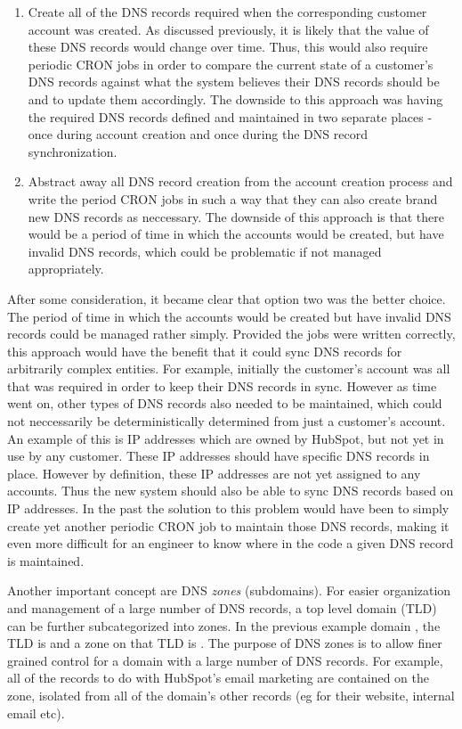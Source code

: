 \begin{enumerate}
    \item{Create all of the DNS records required when the corresponding customer account was created. As discussed previously, it is likely that the value of these DNS records would change over time. Thus, this would also require periodic CRON jobs in order to compare the current state of a customer's DNS records against what the system believes their DNS records should be and to update them accordingly. The downside to this approach was having the required DNS records defined and maintained in two separate places - once during account creation and once during the DNS record synchronization.}
    \item{Abstract away all DNS record creation from the account creation process and write the period CRON jobs in such a way that they can also create brand new DNS records as neccessary. The downside of this approach is that there would be a period of time in which the accounts would be created, but have invalid DNS records, which could be problematic if not managed appropriately.}  
\end{enumerate}

After some consideration, it became clear that option two was the better choice. The period of time in which the accounts would be created but have invalid DNS records could be managed rather simply. Provided the jobs were written correctly, this approach would have the benefit that it could sync DNS records for arbitrarily complex entities. For example, initially the customer's account was all that was required in order to keep their DNS records in sync. However as time went on, other types of DNS records also needed to be maintained, which could not neccessarily be deterministically determined from just a customer's account. An example of this is IP addresses which are owned by HubSpot, but not yet in use by any customer. These IP addresses should have specific DNS records in place. However by definition, these IP addresses are not yet assigned to any accounts. Thus the new system should also be able to sync DNS records based on IP addresses. In the past the solution to this problem would have been to simply create yet another periodic CRON job to maintain those DNS records, making it even more difficult for an engineer to know where in the code a given DNS record is maintained.

Another important concept are DNS \textit{zones} (subdomains). For easier organization and management of a large number of DNS records, a top level domain (TLD) can be further subcategorized into zones. In the previous example domain , the TLD is  and a zone on that TLD is . The purpose of DNS zones is to allow finer grained control for a domain with a large number of DNS records. For example, all of the records to do with HubSpot's email marketing are contained on the  zone, isolated from all of the domain's other records (eg for their website, internal email etc). 

